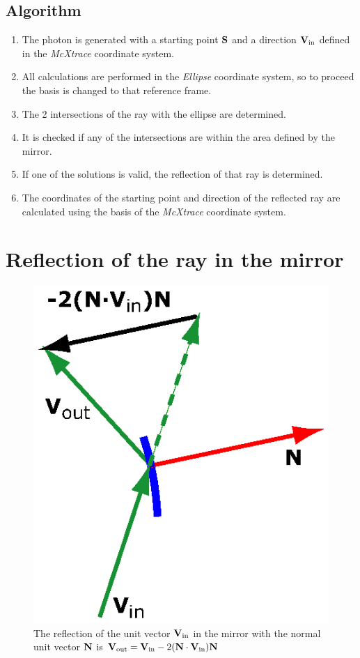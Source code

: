 \subsection{Algorithm}
\begin{enumerate}
\item The photon is generated with a starting point $\bf{S}$ and a direction
$\bf{V}_\textrm{in}$ defined in the \emph{McXtrace} coordinate
system.
\item All calculations are performed in the \emph{Ellipse} coordinate system,
so to proceed the basis is changed to that reference frame.
\item The 2 intersections of the ray with the ellipse are determined.
\item It is checked if any of the intersections are within the area
defined by the mirror.
\item If one of the solutions is valid, the reflection of that ray is
determined.
\item The coordinates of the starting point and direction of the
reflected ray are calculated using the basis of the \emph{McXtrace}
coordinate system.
\end{enumerate}


\section{Reflection of the ray in the mirror}
\begin{figure}[htb!]
\centering
\includegraphics[width=0.3\linewidth]{figures/Dotproduct.eps}
 \caption{The reflection of the unit vector $\bf{V}_\textrm{in}$ in the mirror with the normal unit
 vector ${\bf{N}}$ is ${\bf{V}}_\textrm{out} = {\bf{V}}_\textrm{in} -2({\bf{N}}\cdot{\bf{V}}_\textrm{in}){\bf{N}}$}\label{fig:dotProduct}
\end{figure}

